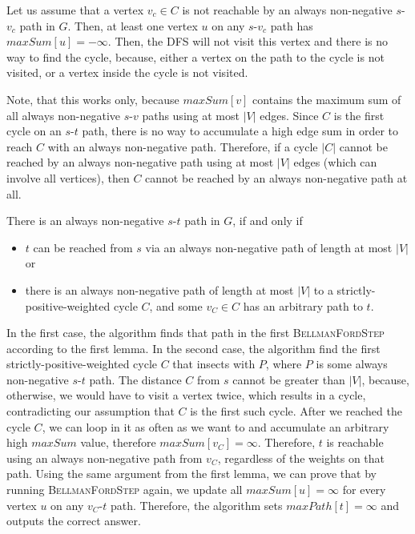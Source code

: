 \documentclass[12pt]{article}
\begin{document}
Let us assume that a vertex $v_c \in C$ is not reachable by an always non-negative $s$-$v_c$ path in $G$. Then, at least one vertex $u$ on any $s$-$v_c$ path has $\mathit{maxSum}[u] = -\infty$. Then, the DFS will not visit this vertex and there is no way to find the cycle, because, either a vertex on the path to the cycle is not visited, or a vertex inside the cycle is not visited.

Note, that this works only, because $\mathit{maxSum}[v]$ contains the maximum sum of all always non-negative $s$-$v$ paths using at most $|V|$ edges. Since $C$ is the first cycle on an $s$-$t$ path, there is no way to accumulate a high edge sum in order to reach $C$ with an always non-negative path. Therefore, if a cycle $|C|$ cannot be reached by an always non-negative path using at most $|V|$ edges (which can involve all vertices), then $C$ cannot be reached by an always non-negative path at all.

\begin{frm-thm}
There is an always non-negative $s$-$t$ path in $G$, if and only if
\begin{itemize}
	\item $t$ can be reached from $s$ via an always non-negative path of length at most $|V|$ or
	\item there is an always non-negative path of length at most $|V|$ to a strictly-positive-weighted cycle $C$, and some $v_C \in C$ has an arbitrary path to $t$.
\end{itemize}
\end{frm-thm}

In the first case, the algorithm finds that path in the first \textsc{BellmanFordStep} according to the first lemma. In the second case, the algorithm find the first strictly-positive-weighted cycle $C$ that insects with $P$, where $P$ is some always non-negative $s$-$t$ path. The distance $C$ from $s$ cannot be greater than $|V|$, because, otherwise, we would have to visit a vertex twice, which results in a cycle, contradicting our assumption that $C$ is the first such cycle. After we reached the cycle $C$, we can loop in it as often as we want to and accumulate an arbitrary high $\mathit{maxSum}$ value, therefore $\mathit{maxSum}[v_C] = \infty$. Therefore, $t$ is reachable using an always non-negative path from $v_C$, regardless of the weights on that path. Using the same argument from the first lemma, we can prove that by running \textsc{BellmanFordStep} again, we update all $\mathit{maxSum}[u] = \infty$ for every vertex $u$ on any $v_C$-$t$ path. Therefore, the algorithm sets $\mathit{maxPath}[t] = \infty$ and outputs the correct answer. 
\end{document}
